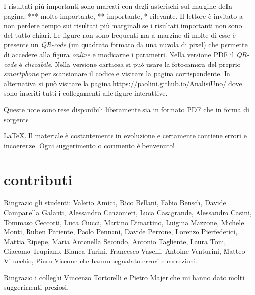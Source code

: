 I risultati più importanti sono marcati con degli asterischi sul margine %
della pagina: *** molto importante, ** importante, * rilevante. %
Il lettore è invitato a non perdere tempo sui risultati più marginali %
se i risultati importanti non sono del tutto chiari. %
Le figure non sono frequenti ma a margine di molte di esse  %
è presente un \emph{QR-code} (un quadrato formato da una nuvola di pixel) %
che permette di accedere alla figura  %
\emph{online} e modicarne i parametri.  %
Nella versione PDF il \emph{QR-code} è \emph{cliccabile}.  %
Nella versione cartacea si può usare la fotocamera del proprio %
\emph{smartphone} per scansionare il codice e visitare la pagina corrispondente. %
In alternativa si può visitare la pagina \url{https://paolini.github.io/AnalisiUno/}
dove sono inseriti tutti i collegamenti alle figure interattive.
\begin{comment}
Di seguito in questa pagina trovate l'elenco %
con i collegamenti alle figure interattive. %
\end{comment}
Queste note sono rese disponibili liberamente sia in formato PDF che %
in forma di sorgente %
\begin{comment}
LaTeX. %
\end{comment}
\LaTeX{}.
Il materiale è costantemente in evoluzione %
e certamente contiene errori e incoerenze. Ogni suggerimento o commento è %
benvenuto! %


\section*{contributi}

Ringrazio gli studenti:
%
Valerio Amico,
Rico Bellani,
Fabio Bensch,
Davide Campanella Galanti,
Alessandro Canzonieri,
Luca Casagrande,
Alessandro Casini,
Tommaso Ceccotti,
Luca Ciucci,
Martino Dimartino,
Luigina Mazzone,
Michele Monti,
Ruben Pariente,
Paolo Pennoni,
Davide Perrone,
Lorenzo Pierfederici,
Mattia Ripepe,
Maria Antonella Secondo,
Antonio Tagliente,
Laura Toni,
Giacomo Trupiano,
Bianca Turini,
Francesco Vaselli,
Antoine Venturini,
Matteo Vilucchio,
Piero Viscone
%
che hanno segnalato errori e correzioni.

Ringrazio i colleghi Vincenzo Tortorelli e Pietro Majer
che mi hanno dato molti suggerimenti preziosi.

